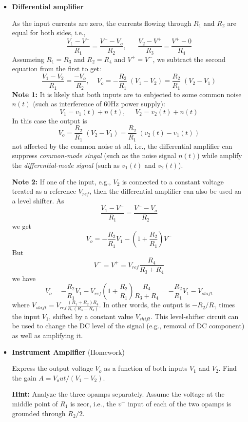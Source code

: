 \begin{itemize}
\item {\bf Differential amplifier}


As the input currents are zero, the currents flowing through $R_1$ and 
$R_2$ are equal for both sides, i.e.,
\[	\frac{V_1-V^-}{R_1}=\frac{V^--V_o}{R_2},\;\;\;\;\;\;
	\frac{V_2-V^+}{R_3}=\frac{V^+-0}{R_4}		\]
Assumeing $R_1=R_3$ and $R_2=R_4$ and $V^+=V^-$, we subtract the second 
equation from the first to get:
\[	\frac{V_1-V_2}{R_1}=\frac{-V_o}{R_2},\;\;\;\;
	V_o=-\frac{R_2}{R_1}\;(V_1-V_2)=\frac{R_2}{R_1}\;(V_2-V_1)	\]
{\bf Note 1:} It is likely that both inputs are to subjected to some
common noise $n(t)$ (such as interference of 60Hz power supply):
\[ V_1=v_1(t)+n(t), \;\;\;\;\;V_2=v_2(t)+n(t) \]
In this case the output is 
\[ V_o=\frac{R_2}{R_1}\;(V_2-V_1)=\frac{R_2}{R_1}\;(v_2(t)-v_1(t)) \]
not affected by the common noise at all, i.e., the differential amplifier 
can suppress {\em common-mode singal} (such as the noise signal $n(t)$)
while amplify the {\em differential-mode signal} (such as $v_1(t)$ and
$v_2(t)$).

{\bf Note 2:} If one of the input, e.g., $V_2$ is connected to a constant
voltage treated as a reference $V_{ref}$, then the differential amplifier
can also be used aa a level shifter. As
\[	\frac{V_1-V^-}{R_1}=\frac{V^--V_o}{R_2} \]
we get
\[ V_o=-\frac{R_2}{R_1}V_1-(1+\frac{R_2}{R_1})V^- \]
But 
\[ V^-=V^+=V_{ref}\frac{R_4}{R_3+R_4} \]
we have
\[ V_o=-\frac{R_2}{R_1}V_1-V_{ref}(1+\frac{R_2}{R_1})\frac{R_4}{R_3+R_4}
=-\frac{R_2}{R_1}V_1-V_{shift} \]
where $V_{shift}=V_{ref}\frac{(R_1+R_2)R_4}{R_1(R_3+R_4)}$. In other
words, the output is $-R_2/R_1$ times the input $V_1$, shifted by a
constant value $V_{shift}$. This level-shifter circuit can be used to
change the DC level of the signal (e.g., removal of DC component) as 
well as amplifying it.

\item {\bf Instrument Amplifier} (Homework)


Express the output voltage $V_o$ as a function of both inputs $V_1$ and
$V_2$. Find the gain $A=V_out/(V_1-V_2)$.

{\bf Hint:} Analyze the three opamps separately. Assume the voltage at
the middle point of $R_1$ is zeor, i.e., the $v^-$ input of each of the
two opamps is grounded through $R_2/2$.




\end{itemize}
